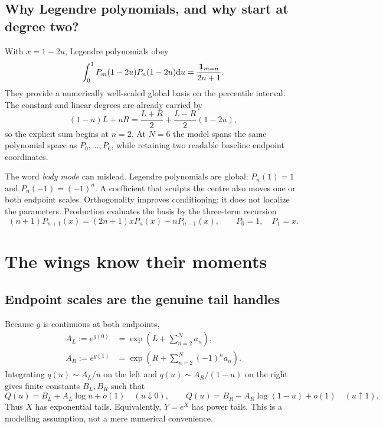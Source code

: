 \documentclass[11pt]{article}
\begin{document}
\subsection{Why Legendre polynomials, and why start at degree two?}

With $x=1-2u$, Legendre polynomials obey
\begin{equation}
\int_0^1P_m(1-2u)P_n(1-2u)\mathrm{d} u
=\frac{\mathbf{1}_{m=n}}{2n+1}.
\label{eq:legendre_orthogonality}
\end{equation}
They provide a numerically well-scaled global basis on the percentile interval.
The constant and linear degrees are already carried by
\begin{equation}
(1-u)L+uR
=\frac{L+R}{2}+\frac{L-R}{2}(1-2u),
\end{equation}
so the explicit sum begins at $n=2$.  At $N=6$ the model spans the same
polynomial space as $P_0,\ldots,P_6$, while retaining two readable baseline
endpoint coordinates.

The word \emph{body mode} can mislead.  Legendre polynomials are global:
$P_n(1)=1$ and $P_n(-1)=(-1)^n$.  A coefficient that sculpts the centre also
moves one or both endpoint scales.  Orthogonality improves conditioning; it
does not localize the parameters.  Production evaluates the basis by the
three-term recursion
\begin{equation}
(n+1)P_{n+1}(x)=(2n+1)xP_n(x)-nP_{n-1}(x),
\qquad P_0=1,\quad P_1=x.
\label{eq:legendre_recursion}
\end{equation}

\section{The wings know their moments}
\label{sec:tails}

\subsection{Endpoint scales are the genuine tail handles}

Because $g$ is continuous at both endpoints,
\begin{align}
A_L:=e^{g(0)}
  &=\exp\!\left(L+\sum_{n=2}^{N}a_n\right), \label{eq:AL}\\
A_R:=e^{g(1)}
  &=\exp\!\left(R+\sum_{n=2}^{N}(-1)^na_n\right).
\label{eq:AR}
\end{align}
Integrating $q(u)\sim A_L/u$ on the left and
$q(u)\sim A_R/(1-u)$ on the right gives finite constants $B_L,B_R$ such that
\begin{equation}
Q(u)=B_L+A_L\log u+o(1)\quad(u\downarrow0),
\qquad
Q(u)=B_R-A_R\log(1-u)+o(1)\quad(u\uparrow1).
\label{eq:quantile_tails}
\end{equation}
Thus $X$ has exponential tails.  Equivalently, $Y=e^X$ has power tails.  This
is a modelling assumption, not a mere numerical convenience.
\end{document}
